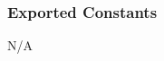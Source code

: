 \documentclass[12pt]{article}
\begin{document}
\subsubsection{Exported Constants}

N/A

	
\end{document}
